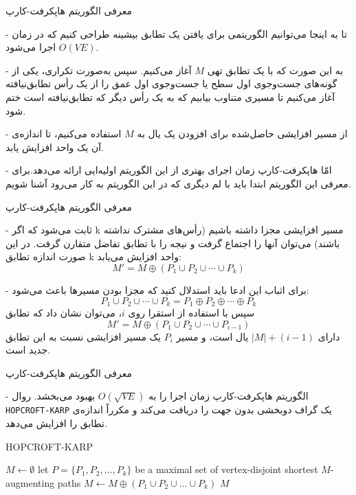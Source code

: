 \begin{itemframe}{‌معرفی الگوریتم هاپکرفت-کارپ}
\item[-]
تا به اینجا می‌توانیم الگوریتمی برای یافتن یک تطابق بیشینه طراحی کنیم که در زمان $O(VE)$ اجرا می‌شود.
\item[-]
به این صورت که با یک تطابق تهی $M$ آغاز می‌کنیم. سپس به‌صورت تکراری، یکی از گونه‌های جست‌وجوی اول سطح یا جست‌وجوی اول عمق را از یک رأس تطابق‌نیافته آغاز می‌کنیم تا مسیری متناوب بیابیم که به یک رأس دیگر که تطابق‌نیافته است ختم شود.
\item[-]
از مسیر افزایشی حاصل‌شده برای افزودن یک یال به $M$ استفاده می‌کنیم، تا اندازه‌ی آن یک واحد افزایش یابد.
\item[-]
امّا هاپکرفت-کارپ زمان اجرای بهتری از این الگوریتم اولیه‌ایی ارائه می‌دهد.برای معرفی این الگوریتم ابتدا باید با لم دیگری که در این الگوریتم به کار می‌رود آشنا شویم.
\end{itemframe}


\begin{itemframe}{‌معرفی الگوریتم هاپکرفت-کارپ}
\item[-]
ثابت می‌شود که اگر k مسیر افزایشی مجزا داشته باشیم (رأس‌های مشترک نداشته باشند) می‌توان آنها را اجتماع گرفت و نیجه را با تطابق تفاضل متقارن گرفت. در این صورت اندازه تطابق k واحد افزایش می‌یابد:
$$M' = M \oplus (P_1 \cup P_2 \cup \cdots \cup P_k)$$
\item[-]
برای اثباب این ادعا باید استدلال کنید که مجزا بودن مسیرها باعث می‌شود:
$$P_1 \cup P_2 \cup \cdots \cup P_k = P_1 \oplus P_2 \oplus \cdots \oplus P_k$$
سپس با استفاده از استقرا روی $i$، می‌توان نشان داد که تطابق
$$M' = M \oplus (P_1 \cup P_2 \cup \cdots \cup P_{i-1})$$
دارای $|M| + (i - 1)$ یال است، و مسیر $P_i$ یک مسیر افزایشی نسبت به این تطابق جدید است.
\end{itemframe}


\begin{itemframe}{‌معرفی الگوریتم هاپکرفت-کارپ}
\item[-]
الگوریتم هاپکرفت-کارپ زمان اجرا را به $O(\sqrt{V E})$ بهبود می‌بخشد. روال \texttt{HOPCROFT-KARP} یک گراف دوبخشی بدون جهت را دریافت می‌کند و مکرراً اندازه‌ی تطابق را افزایش می‌دهد.
\begin{algorithm}[H]\alglr
\caption{HOPCROFT-KARP}
\begin{algorithmic}[1]
	\State $M \gets \emptyset$
	\Repeat
        \State let $P = \{P_1, P_2, \ldots, P_k\}$ be a maximal set of vertex-disjoint shortest $M$-augmenting paths
		\State $M \gets M \oplus (P_1 \cup P_2 \cup \ldots \cup P_k)$
	\State \Return $M$
\end{algorithmic}
\end{algorithm}
\end{itemframe}


